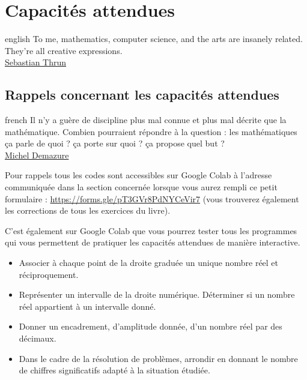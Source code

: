 \documentclass[a4paper, 11pt, twoside]{book}
\begin{document}
\part{Capacités attendues}
\label{sec:org7810a4f}
\startcontents[level-1]
\begin{foreigndisplayquote}{english}
To me, mathematics, computer science, and the arts are insanely
related. They’re all creative expressions.\\

\href{https://en.wikipedia.org/wiki/Sebastian\_Thrun}{Sebastian Thrun}
\end{foreigndisplayquote}

\chapter{Rappels concernant les capacités attendues}
\label{sec:org4b912db}
\startcontents[level-2]

\begin{foreigndisplayquote}{french}
Il n’y a guère de discipline plus mal connue et plus mal décrite
que la mathématique. Combien pourraient répondre à la question :
les mathématiques ça parle de quoi ? ça porte sur quoi ? ça propose
quel but ?\\

\href{https://fr.wikipedia.org/wiki/Michel\_Demazure}{Michel Demazure}
\end{foreigndisplayquote}

Pour rappels tous les codes sont accessibles sur Google Colab à
l'adresse communiquée dans la section concernée lorsque vous
aurez rempli ce petit formulaire :
\url{https://forms.gle/pT3GVr8PdNYCeVir7} (vous trouverez également
les corrections de tous les exercices du livre).

C'est également sur Google Colab que vous pourrez tester tous les
programmes qui vous permettent de pratiquer les capacités attendues
de manière interactive.

\begin{itemize}
\item Associer à chaque point de la droite graduée un unique nombre réel
et réciproquement.
\item Représenter un intervalle de la droite numérique. Déterminer si un
nombre réel appartient à un intervalle donné.
\item Donner un encadrement, d'amplitude donnée, d'un nombre réel par
des décimaux.
\item Dans le cadre de la résolution de problèmes, arrondir en donnant
le nombre de chiffres significatifs adapté à la situation étudiée.
\end{itemize}
\end{document}
